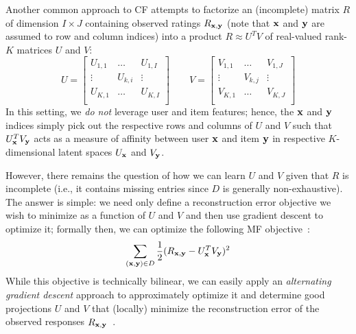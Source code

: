 Another common approach to CF attempts to factorize an (incomplete)
matrix $R$ of dimension $I \times J$ containing observed ratings $R_{\mathbf{x},\mathbf{y}}$ 
(note that $\mathbf{x}$ and $\mathbf{y}$ are assumed to row and column indices)
into a product $R \approx U^T V$ of real-valued
rank-$K$ matrices $U$ and $V$:
\begin{equation*}
U = 
\begin{bmatrix}
  U_{1,1} & \hdots  & U_{1,I} \\
  \vdots  & U_{k,i} & \vdots  \\
  U_{K,1} & \hdots  & U_{K,I} \\
\end{bmatrix}
\qquad 
V = 
\begin{bmatrix}
  V_{1,1} & \hdots  & V_{1,J} \\
  \vdots  & V_{k,j} & \vdots  \\
  V_{K,1} & \hdots  & V_{K,J} \\
\end{bmatrix}
\end{equation*}
In this setting, we \emph{do not} leverage user and item features;
hence, the $\mathbf{x}$ and $\mathbf{y}$ indices simply pick out the respective
rows and columns of $U$ and $V$ such that $U_{\mathbf{x}}^T V_{\mathbf{y}}$ acts as a
measure of affinity between user $\mathbf{x}$ and item $\mathbf{y}$ in respective
$K$-dimensional latent spaces $U_{\mathbf{x}}$ and $V_{\mathbf{y}}$.

However, there remains the question of how we can learn $U$ and $V$
given that $R$ is incomplete (i.e., it contains missing entries since
$D$ is generally non-exhaustive).  The answer is simple: we need only
define a reconstruction error objective we wish to minimize as a
function of $U$ and $V$ and then use gradient descent to optimize it;
formally then, we can optimize the following MF objective~\cite{pmf}:
\begin{align}
\sum_{(\mathbf{x},\mathbf{y}) \in D} \frac{1}{2} (R_{\mathbf{x},\mathbf{y}} - U_{\mathbf{x}}^T V_{\mathbf{y}})^2 \label{eq:basic_mf}
\end{align}
While this objective is technically bilinear, 
we can easily apply an
\emph{alternating gradient descent} approach to approximately
optimize it and determine good projections $U$ and
$V$ that (locally) minimize the reconstruction error of the observed
responses $R_{\mathbf{x},\mathbf{y}}$~\cite{pmf}.

